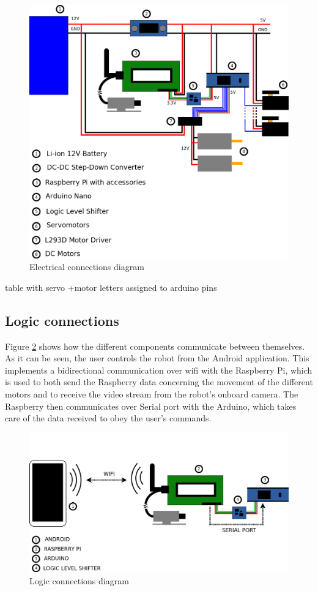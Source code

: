 	\begin{figure}[H]
			\centering
			\includegraphics[width=15cm, angle=0]{images/Diagrams/electrical.png}
			\caption{Electrical connections diagram }
			\label{electricDiagram}
	\end{figure}
	\bigskip
	
table with servo +motor letters assigned to arduino pins


\subsection{Logic connections}

Figure \ref{logicDiagram} shows how the different components communicate between themselves. As it can be seen, the user controls the robot from the Android application. This implements a bidirectional communication over wifi with the Raspberry Pi, which is used to both send the Raspberry data concerning the movement of the different motors and to receive the video stream from the robot's onboard camera. The Raspberry then communicates over Serial port with the Arduino, which takes care of the data received to obey the user's commands.\\

	\begin{figure}[H]
			\centering
			\includegraphics[width=15cm, angle=0]{images/Diagrams/logic.png}
			\caption{Logic connections diagram }
			\label{logicDiagram}
	\end{figure}
	\bigskip